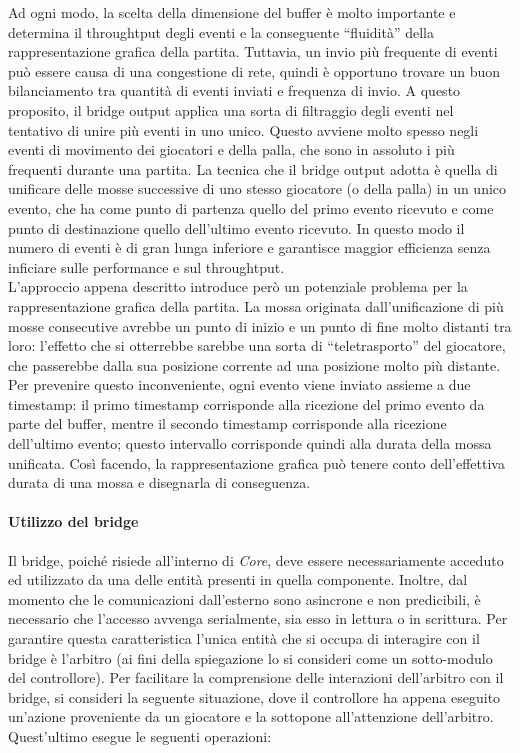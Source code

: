 Ad ogni modo, la scelta della dimensione del buffer è molto importante e determina il throughtput degli eventi e la conseguente ``fluidità'' della rappresentazione grafica della partita. Tuttavia, un invio più frequente di eventi può essere causa di una congestione di rete, quindi è opportuno trovare un buon bilanciamento tra quantità di eventi inviati e frequenza di invio. A questo proposito, il bridge output applica una sorta di filtraggio degli eventi nel tentativo di unire più eventi in uno unico. Questo avviene molto spesso negli eventi di movimento dei giocatori e della palla, che sono in assoluto i più frequenti durante una partita. La tecnica che il bridge output adotta è quella di unificare delle mosse successive di uno stesso giocatore (o della palla) in un unico evento, che ha come punto di partenza quello del primo evento ricevuto e come punto di destinazione quello dell'ultimo evento ricevuto. In questo modo il numero di eventi è di gran lunga inferiore e garantisce maggior efficienza senza inficiare sulle performance e sul throughtput.\\

L'approccio appena descritto introduce però un potenziale problema per la rappresentazione grafica della partita. La mossa originata dall'unificazione di più mosse consecutive avrebbe un punto di inizio e un punto di fine molto distanti tra loro: l'effetto che si otterrebbe sarebbe una sorta di ``teletrasporto'' del giocatore, che passerebbe dalla sua posizione corrente ad una posizione molto più distante. Per prevenire questo inconveniente, ogni evento viene inviato assieme a due timestamp: il primo timestamp corrisponde alla ricezione del primo evento da parte del buffer, mentre il secondo timestamp corrisponde alla ricezione dell'ultimo evento; questo intervallo corrisponde quindi alla durata della mossa unificata. Così facendo, la rappresentazione grafica può tenere conto dell'effettiva durata di una mossa e disegnarla di conseguenza.\\

\paragraph{Utilizzo del bridge}\label{sec:analisi_distribuzione_bridge_utilizzo} Il bridge, poiché risiede all'interno di \textit{Core}, deve essere necessariamente acceduto ed utilizzato da una delle entità presenti in quella componente. Inoltre, dal momento che le comunicazioni dall'esterno sono asincrone e non predicibili, è necessario che l'accesso avvenga serialmente, sia esso in lettura o in scrittura. Per garantire questa caratteristica l'unica entità che si occupa di interagire con il bridge è l'arbitro (ai fini della spiegazione lo si consideri come un sotto-modulo del controllore). Per facilitare la comprensione delle interazioni dell'arbitro con il bridge, si consideri la seguente situazione, dove il controllore ha appena eseguito un'azione proveniente da un giocatore e la sottopone all'attenzione dell'arbitro. Quest'ultimo esegue le seguenti operazioni:

